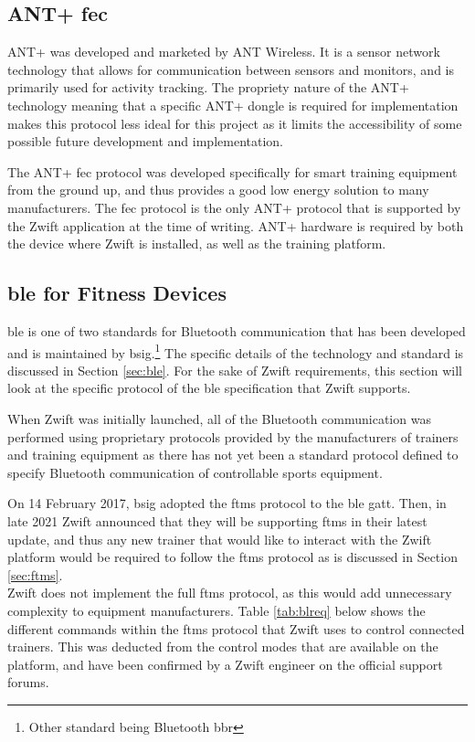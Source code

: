 \subsection{ANT+ \acl{fec}}

ANT+ was developed and marketed by ANT Wireless. It is a sensor network technology that allows for communication between sensors and monitors, and is primarily used for activity tracking. The propriety nature of the ANT+ technology meaning that a specific ANT+ dongle is required for implementation makes this protocol less ideal for this project as it limits the accessibility of some possible future development and implementation.

The ANT+ \ac{fec} protocol was developed specifically for smart training equipment from the ground up, and thus provides a good low energy solution to many manufacturers. The \ac{fec} protocol is the only ANT+ protocol that is supported by the Zwift application at the time of writing. ANT+ hardware is required by both the device where Zwift is installed, as well as the training platform.

\subsection{\ac{ble} for Fitness Devices}
\ac{ble} is one of two standards for Bluetooth communication that has been developed and is maintained by \ac{bsig}.\footnote{Other standard being Bluetooth \ac{bbr}} The specific details of the technology and standard is discussed in Section \ref{sec:ble}. For the sake of Zwift requirements, this section will look at the specific protocol of the \ac{ble} specification that Zwift supports.

When Zwift was initially launched, all of the Bluetooth communication was performed using proprietary protocols provided by the manufacturers of trainers and training equipment as there has not yet been a standard protocol defined to specify Bluetooth communication of controllable sports equipment.

On 14 February 2017, \ac{bsig} adopted the \ac{ftms} protocol to the \ac{ble} \ac{gatt}. Then, in late 2021 Zwift announced that they will be supporting \ac{ftms} in their latest update, and thus any new trainer that would like to interact with the Zwift platform would be required to follow the \ac{ftms} protocol as is discussed in Section \ref{sec:ftms}. \citep{Jeremy:2021}\\

Zwift does not implement the full \ac{ftms} protocol, as this would add unnecessary complexity to equipment manufacturers. Table \ref{tab:blreq} below shows the different commands within the \ac{ftms} protocol that Zwift uses to control connected trainers. This was deducted from the control modes that are available on the platform, and have been confirmed by a Zwift engineer on the official support forums. \citep{Jeremy:2021}

